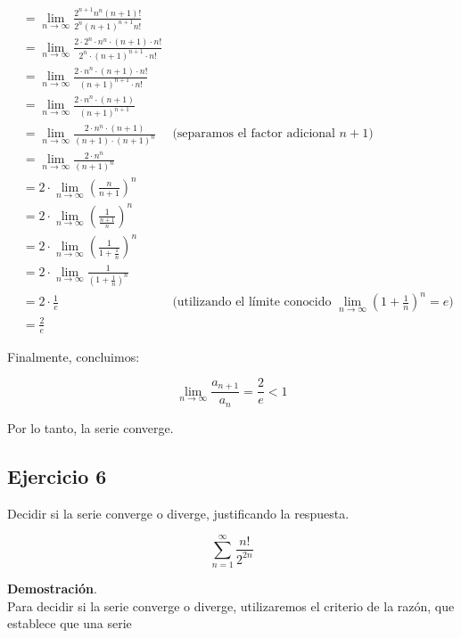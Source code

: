\documentclass{article}
\begin{document}
    $$
    \begin{aligned}
    & = \lim _{n \rightarrow \infty} \frac{2^{n+1} n^{n}(n+1)!}{2^{n}(n+1)^{n+1} n!} \\
    & = \lim _{n \rightarrow \infty} \frac{2 \cdot 2^{n} \cdot n^{n} \cdot (n+1) \cdot n!}{2^{n} \cdot (n+1)^{n+1} \cdot n!} \\
    & = \lim _{n \rightarrow \infty} \frac{2 \cdot n^{n} \cdot (n+1) \cdot n!}{(n+1)^{n+1} \cdot n!} \\
    & = \lim _{n \rightarrow \infty} \frac{2 \cdot n^{n} \cdot (n+1)}{(n+1)^{n+1}} \\
    & = \lim _{n \rightarrow \infty} \frac{2 \cdot n^{n} \cdot (n+1)}{(n+1) \cdot (n+1)^n} & \text{(separamos el factor adicional $n+1$)} \\
    & = \lim _{n \rightarrow \infty} \frac{2 \cdot n^{n}}{(n+1)^n} \\
    & = 2 \cdot \lim _{n \rightarrow \infty} \left(\frac{n}{n+1}\right)^{n} \\
    & = 2 \cdot \lim _{n \rightarrow \infty} \left(\frac{1}{\frac{n+1}{n}}\right)^{n} \\
    & = 2 \cdot \lim _{n \rightarrow \infty} \left(\frac{1}{1+\frac{1}{n}}\right)^{n} \\
    & = 2 \cdot \lim _{n \rightarrow \infty} \frac{1}{\left(1+\frac{1}{n}\right)^{n}} \\
    & = 2 \cdot \frac{1}{e} & \text{(utilizando el límite conocido $\lim_{n \rightarrow \infty} \left(1 + \frac{1}{n}\right)^n = e$)} \\
    & = \frac{2}{e}
    \end{aligned}
    $$

    Finalmente, concluimos:

    $$
    \lim _{n \rightarrow \infty} \frac{a_{n+1}}{a_{n}} = \frac{2}{e} < 1
    $$

    Por lo tanto, la serie converge.

    \subsection*{Ejercicio 6}

    Decidir si la serie converge o diverge, justificando la respuesta.

    $$
    \sum_{n=1}^{\infty} \frac{n!}{2^{2 n}}
    $$

    \textbf{Demostración}.\\

    Para decidir si la serie converge o diverge, utilizaremos el criterio de la razón, que establece que una serie
\end{document}
